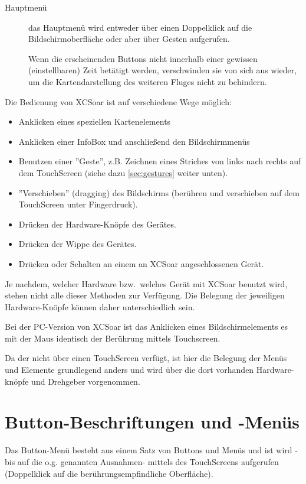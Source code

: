 \begin{description}
\item[Hauptmenü] das Hauptmenü wird entweder über einen Doppelklick auf die Bildschirmoberfläche oder aber über Gesten  aufgerufen.

   Wenn die erscheinenden Buttons nicht innerhalb einer gewissen (einstellbaren) Zeit  betätigt  werden, verschwinden sie von sich aus wieder, um die Kartendarstellung des weiteren Fluges nicht zu behindern.
\end{description}

Die Bedienung von \textsf{XCSoar} ist auf verschiedene Wege möglich:

\begin{itemize}
\item Anklicken eines speziellen Kartenelements
\item Anklicken einer InfoBox und anschließend den Bildschirmmenüs
\item Benutzen einer ''Geste'', z.B. Zeichnen eines Striches von links nach rechts auf dem TouchScreen
 (siehe dazu  \ref{sec:gestures} weiter unten).
\item ''Verschieben'' (dragging) des Bildschirms (berühren und verschieben auf dem TouchScreen unter Fingerdruck).
\item Drücken der Hardware-Knöpfe des  Gerätes.
\item Drücken der Wippe des Gerätes.
\item Drücken  oder Schalten  an einem an \textsf{XCSoar} angeschlossenen Gerät.
\end{itemize}

Je nachdem, welcher Hardware bzw.\ welches Gerät mit \textsf{XCSoar}  benutzt wird, stehen nicht alle dieser Methoden zur Verfügung. Die Belegung der jeweiligen Hardware-Knöpfe können daher unterschiedlich sein.

Bei der \textsf{PC}-Version von \textsf{XCSoar} ist das Anklicken eines Bildschirmelements es mit der Maus identisch der Berührung mittels Touchscreen.

Da der \al nicht über einen TouchScreen verfügt, ist hier die Belegung der Menüs und Elemente grundlegend anders und wird über die dort vorhanden Hardware-knöpfe und Drehgeber vorgenommen.


\section{Button-Beschriftungen und -Menüs}
Das Button-Menü besteht aus einem Satz von Buttons und Menüs und ist wird -bis auf die o.g. genannten Ausnahmen- mittels des TouchScreens aufgerufen (Doppelklick auf die berührungsempfindliche Oberfläche).

